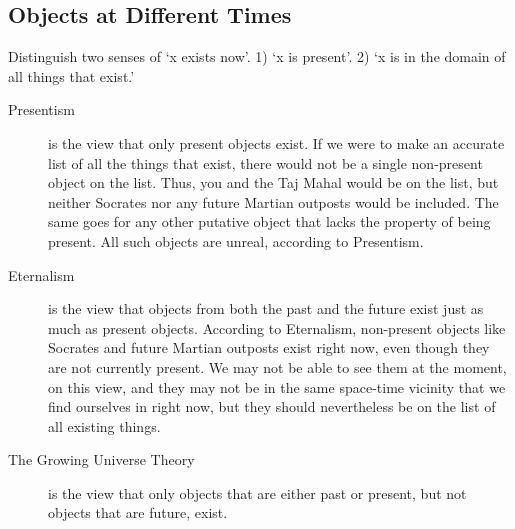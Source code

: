 \documentclass[oneside]{article}
\begin{document}
\subsection*{Objects at Different Times}

Distinguish two senses of `x exists now'. 1) `x is present'. 2) `x is in the domain of all things that exist.' 

\begin{description}
\item[Presentism] is the view that only present objects exist. If we were to make an accurate list of all the things that exist, there would not be a single non-present object on the list. Thus, you and the Taj Mahal would be on the list, but neither Socrates nor any future Martian outposts would be included. The same goes for any other putative object that lacks the property of being present. All such objects are unreal, according to Presentism.
\item[Eternalism] is the view that objects from both the past and the future exist just as much as present objects. According to Eternalism, non-present objects like Socrates and future Martian outposts exist right now, even though they are not currently present. We may not be able to see them at the moment, on this view, and they may not be in the same space-time vicinity that we find ourselves in right now, but they should nevertheless be on the list of all existing things.
\item[The Growing Universe Theory] is the view that only objects that are either past or present, but not objects that are future, exist. 
\end{description}
\end{document}
